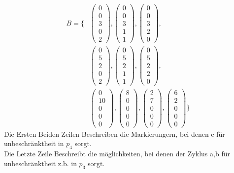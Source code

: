 \begin{align*}
B=\{
&\begin{pmatrix}
0\\0\\3\\0\\2
\end{pmatrix},
\begin{pmatrix}
0\\0\\3\\1\\1
\end{pmatrix},
\begin{pmatrix}
0\\0\\3\\2\\0
\end{pmatrix},\\
&\begin{pmatrix}
0\\5\\2\\0\\2
\end{pmatrix},
\begin{pmatrix}
0\\5\\2\\1\\1
\end{pmatrix},
\begin{pmatrix}
0\\5\\2\\2\\0
\end{pmatrix},\\
&\begin{pmatrix}
0\\10\\0\\0\\0
\end{pmatrix},
\begin{pmatrix}
8\\0\\0\\0\\0
\end{pmatrix},
\begin{pmatrix}
2\\7\\0\\0\\0
\end{pmatrix},
\begin{pmatrix}
6\\2\\0\\0\\0
\end{pmatrix}
\}
\end{align*}
Die Ersten Beiden Zeilen Beschreiben die Markierungern, bei denen c für unbeschränktheit in $p_4$ sorgt.\\
Die Letzte Zeile Beschreibt die möglichkeiten, bei denen der Zyklus a,b für unbeschränktheit z.b. in $p_3$ sorgt.